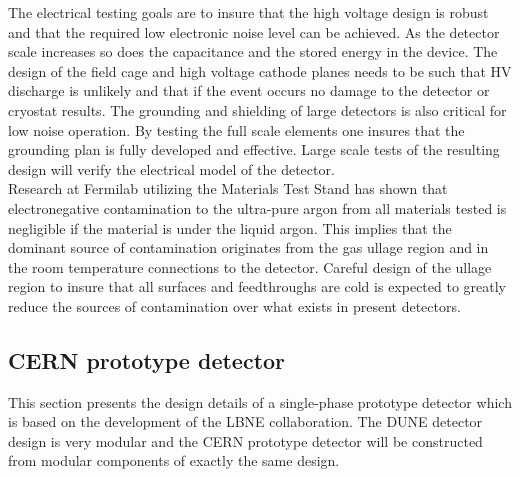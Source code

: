 	 
	 The electrical testing goals are to insure that the high voltage design is robust and that the required low electronic noise level can be achieved. As the detector scale increases so does the capacitance and the stored energy in the device. The design of the field cage and high voltage cathode planes needs to be such that HV discharge is unlikely and that if the event occurs no damage to the detector or cryostat results. The grounding and shielding of large detectors is also critical for low noise operation. By testing the full scale elements one insures that the grounding plan is fully developed and effective. Large scale tests of the resulting design will verify the electrical model of the detector. \\

	 Research at Fermilab utilizing the Materials Test Stand has shown that electronegative contamination to the ultra-pure argon from all materials tested is negligible if the material is under the liquid argon. This implies that the dominant source of contamination originates from the gas ullage region and in the room temperature connections to the detector. Careful design of the ullage region to insure that all surfaces and feedthroughs are cold is expected to greatly reduce the sources of contamination over what exists in present detectors. 
	 
\subsection{CERN prototype detector}



This section presents the design details of a single-phase prototype detector which is based on the development of the LBNE collaboration. 
The DUNE detector design is very modular and the CERN prototype detector will be constructed from modular components of exactly the same design.

